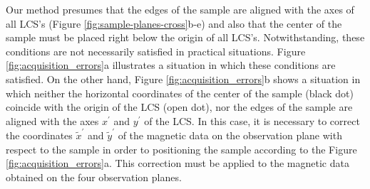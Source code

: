 \documentclass[galley,gc]{agutex}
\begin{document}
\begin{article}
Our method presumes that the edges of the sample are 
aligned with the axes of all LCS's (Figure 
\ref{fig:sample-planes-cross}b-e) and also that the 
center of the sample must be placed right
below the origin of all LCS's.
Notwithstanding, these conditions are not necessarily satisfied
in practical situations.
Figure \ref{fig:acquisition_errors}a illustrates a situation
in which these conditions are satisfied.
On the other hand, Figure \ref{fig:acquisition_errors}b 
shows a situation in which neither the horizontal coordinates of 
the center of the sample (black dot) coincide with the origin of 
the LCS (open dot), nor the edges of the sample are aligned with
the axes $x^{\prime}$ and $y^{\prime}$ of the LCS.
In this case, it is necessary to correct the coordinates
$\tilde{x}^{\prime}$ and $\tilde{y}^{\prime}$ of the 
magnetic data on the observation plane with respect to the sample 
in order to positioning the sample according to the Figure
\ref{fig:acquisition_errors}a.
This correction must be applied to the
magnetic data obtained on the four observation planes.


\end{article}
\end{document}
